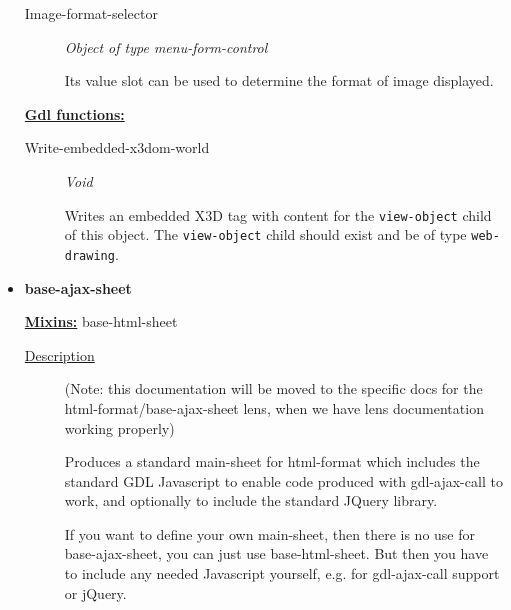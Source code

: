 \documentclass [11pt]{book}
\begin{document}
\begin{itemize}
\begin{description}

\item [Image-format-selector]
\emph{Object of type menu-form-control}

 Its value slot can be used to determine the format of image displayed.




\end{description}






\textbf{
\underline{Gdl functions:}}

\begin{description}

\item [Write-embedded-x3dom-world]
\emph{Void}

 Writes an embedded X3D tag with content for the \texttt{view-object} child of this object.
The \texttt{view-object} child should exist and be of type \texttt{web-drawing}.




\end{description}







\item {}
\label{prim:base-ajax-sheet}
\textbf{base-ajax-sheet}


\textbf{
\underline{Mixins:}} base-html-sheet





\begin{description}

\item [
\underline{Description}]


(Note: this documentation will be moved
to the specific docs for the html-format/base-ajax-sheet lens, when 
we have lens documentation working properly)

Produces a standard main-sheet for html-format which includes the
standard GDL Javascript to enable code produced with gdl-ajax-call to
work, and optionally to include the standard JQuery library.

If you want to define your own main-sheet, then there is no use for
base-ajax-sheet, you can just use base-html-sheet. But then you have
to include any needed Javascript yourself, e.g. for gdl-ajax-call
support or jQuery.


\end{description}
\end{itemize}
\end{document}
